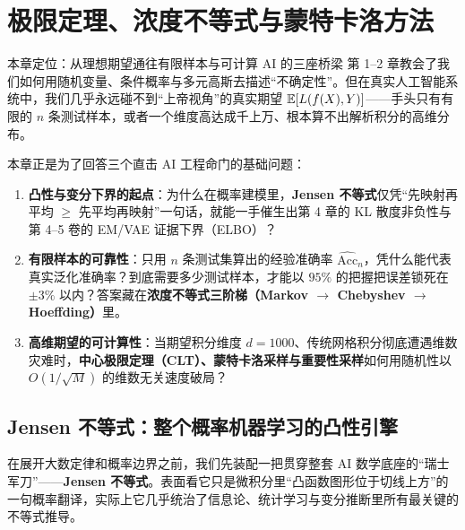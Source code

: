 \chapter[极限定理、浓度不等式与蒙特卡洛]{极限定理、浓度不等式与蒙特卡洛方法}
\label{ch:ch3}


\begin{chapIntro}{本章定位：从理想期望通往有限样本与可计算 AI 的三座桥梁}
第 1--2 章教会了我们如何用随机变量、条件概率与多元高斯去描述“不确定性”。但在真实人工智能系统中，我们几乎永远碰不到“上帝视角”的真实期望 $\mathbb{E}[L(f(X), Y)]$——手头只有有限的 $n$ 条测试样本，或者一个维度高达成千上万、根本算不出解析积分的高维分布。

本章正是为了回答三个直击 AI 工程命门的基础问题：
\begin{enumerate}
  \item \textbf{凸性与变分下界的起点}：为什么在概率建模里，\textbf{Jensen 不等式}仅凭“先映射再平均 $\ge$ 先平均再映射”一句话，就能一手催生出第 4 章的 KL 散度非负性与第 4--5 卷的 EM/VAE 证据下界（ELBO）？
  \item \textbf{有限样本的可靠性}：只用 $n$ 条测试集算出的经验准确率 $\widehat{\mathrm{Acc}}_n$，凭什么能代表真实泛化准确率？到底需要多少测试样本，才能以 $95\%$ 的把握把误差锁死在 $\pm 3\%$ 以内？答案藏在\textbf{浓度不等式三阶梯（Markov $\to$ Chebyshev $\to$ Hoeffding）}里。
  \item \textbf{高维期望的可计算性}：当期望积分维度 $d = 1000$、传统网格积分彻底遭遇维数灾难时，\textbf{中心极限定理（CLT）、蒙特卡洛采样与重要性采样}如何用随机性以 $O(1/\sqrt{M})$ 的维数无关速度破局？
\end{enumerate}
\end{chapIntro}

\section{Jensen 不等式：整个概率机器学习的凸性引擎}
\label{sec:ch3-jensen}

在展开大数定律和概率边界之前，我们先装配一把贯穿整套 AI 数学底座的“瑞士军刀”——\textbf{Jensen 不等式}。表面看它只是微积分里“凸函数图形位于切线上方”的一句概率翻译，实际上它几乎统治了信息论、统计学习与变分推断里所有最关键的不等式推导。

